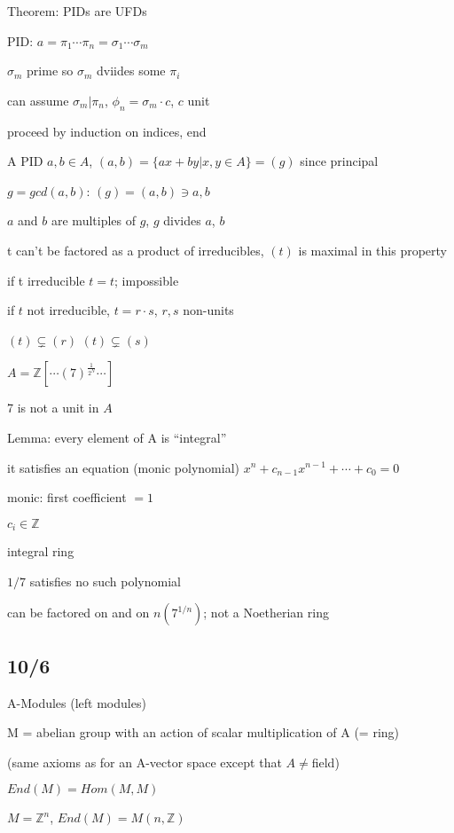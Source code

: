 \documentclass[12pt]{article}
\begin{document}
\noindent
Theorem: PIDs are UFDs

PID: $a = \pi_1 \cdots \pi_n = \sigma_1 \cdots \sigma_m$

$\sigma_m$ prime so $\sigma_m$ dviides some $\pi_i$

can assume $\sigma_m | \pi_n$, $\phi_n = \sigma_m \cdot c$, $c$ unit

proceed by induction on indices, end

\noindent
A PID $a, b \in A$, $(a, b) = \{ax + by | x, y \in A\} = (g)$ since principal

$g = gcd(a, b)$: $(g) = (a, b) \ni a, b$

$a$ and $b$ are multiples of $g$, $g$ divides $a$, $b$

\noindent
t can't be factored as a product of irreducibles, $(t)$ is maximal in this property

\noindent
if t irreducible $t = t$; impossible

if $t$ not irreducible, $t = r \cdot s$, $r, s$ non-units

$(t) \subsetneq (r)$ $(t) \subsetneq (s)$

\noindent
$A = \mathds{Z}[\cdots (7)^{\frac{1}{2^N}} \cdots]$

7 is not a unit in $A$

\noindent
Lemma: every element of A is ``integral''

it satisfies an equation (monic polynomial) $x^n + c_{n-1}x^{n-1} + \cdots + c_0 = 0$

monic: first coefficient $= 1$

$c_i \in \mathds{Z}$

integral ring

\noindent
$1/7$ satisfies no such polynomial

 can be factored on and on $n(7^{1/n})$; not a Noetherian ring

\subsection{10/6}

\noindent
A-Modules (left modules)

M = abelian group with an action of scalar multiplication of A (= ring)

(same axioms as for an A-vector space except that $A \neq $field)

\noindent
$End(M) = Hom(M, M)$

$M = \mathds{Z}^n$, $End(M) = M(n, \mathds{Z})$
\end{document}
